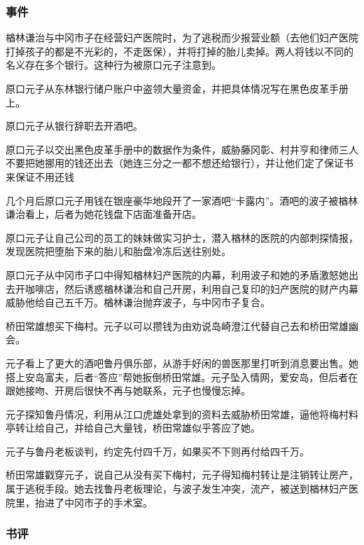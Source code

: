 \subsubsection{事件}

\begin{itemize*}
    \item 楢林谦治与中冈市子在经营妇产医院时，为了逃税而少报营业额（去他们妇产医院打掉孩子的都是不光彩的，不走医保），并将打掉的胎儿卖掉。两人将钱以不同的名义存在多个银行。这种行为被原口元子注意到。
    \item 原口元子从东林银行储户账户中盗领大量资金，并把具体情况写在黑色皮革手册上。
    \item 原口元子从银行辞职去开酒吧。
    \item 原口元子以交出黑色皮革手册中的数据作为条件，威胁藤冈彰、村井亨和律师三人不要把她挪用的钱还出去（她连三分之一都不想还给银行），并让他们定了保证书来保证不用还钱
    \item 几个月后原口元子用钱在银座豪华地段开了一家酒吧“卡露内”。酒吧的波子被楢林谦治看上，后者为她花钱盘下店面准备开店。
    \item 原口元子让自己公司的员工的妹妹做实习护士，潜入楢林的医院的内部刺探情报，发现医院把堕胎下来的胎儿和胎盘冷冻后送往别处。
    \item 原口元子从中冈市子口中得知楢林妇产医院的内幕，利用波子和她的矛盾激怒她出去开咖啡店，然后诱惑楢林谦治和自己开房，利用自己复印的妇产医院的财产内幕威胁他给自己五千万。楢林谦治抛弃波子，与中冈市子复合。
    \item 桥田常雄想买下梅村。元子以可以攒钱为由劝说岛崎澄江代替自己去和桥田常雄幽会。
    \item 元子看上了更大的酒吧鲁丹俱乐部，从游手好闲的兽医那里打听到消息要出售。她搭上安岛富夫，后者“答应”帮她扳倒桥田常雄。元子坠入情网，爱安岛，但后者在跟她接吻、开房后很快不再与她联系，元子也慢慢忘掉。
    \item 元子探知鲁丹情况，利用从江口虎雄处拿到的资料去威胁桥田常雄，逼他将梅村料亭转让给自己，并给自己大量钱，桥田常雄似乎答应了她。
    \item 元子与鲁丹老板谈判，约定先付四千万，如果买不下则再付给四千万。
    \item 桥田常雄戳穿元子，说自己从没有买下梅村，元子得知梅村转让是注销转让房产，属于逃税手段。她去找鲁丹老板理论，与波子发生冲突，流产，被送到楢林妇产医院里，抬进了中冈市子的手术室。
\end{itemize*}

\subsubsection{书评}

